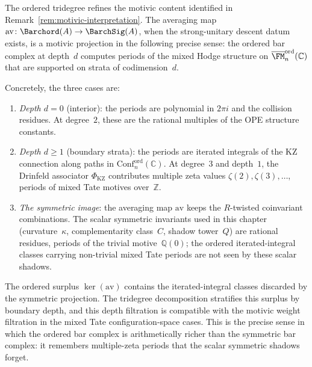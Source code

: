 \begin{remark}
\label{rem:tridegree-motivic}
The ordered tridegree refines the motivic content identified in
Remark~\ref{rem:motivic-interpretation}. The averaging map
$\mathrm{av}\colon\Barchord(A) \to \BarchSig(A)$, when the
strong-unitary descent datum exists, is a motivic projection in the
following precise sense: the ordered bar
complex at depth~$d$ computes periods of the mixed Hodge structure
on $\overline{\FM}_n^{\mathrm{ord}}(\mathbb{C})$ that are supported
on strata of codimension~$d$.

Concretely, the three cases are:
\begin{enumerate}[label=\textup{(\roman*)}]
\item \emph{Depth $d = 0$} (interior): the periods are polynomial in
$2\pi i$ and the collision residues. At degree~$2$, these are
the rational multiples of the OPE structure constants.

\item \emph{Depth $d \geq 1$} (boundary strata): the periods are
iterated integrals of the KZ connection along paths in
$\mathrm{Conf}_n^{\mathrm{ord}}(\mathbb{C})$. At degree~$3$ and
depth~$1$, the Drinfeld associator $\Phi_{\mathrm{KZ}}$
contributes multiple zeta values $\zeta(2), \zeta(3), \ldots$,
periods of mixed Tate motives over~$\mathbb{Z}$.

\item \emph{The symmetric image}: the averaging map $\mathrm{av}$
keeps the $R$-twisted coinvariant combinations. The scalar symmetric
invariants used in this chapter (curvature~$\kappa$,
complementarity class~$C$, shadow tower~$Q$) are rational residues,
periods of the trivial motive~$\mathbb{Q}(0)$; the ordered
iterated-integral classes carrying non-trivial mixed Tate periods
are not seen by these scalar shadows.
\end{enumerate}

\noindent
The ordered surplus $\ker(\mathrm{av})$ contains the iterated-integral
classes discarded by the symmetric projection. The tridegree
decomposition stratifies this surplus by boundary depth, and this
depth filtration is compatible with the motivic weight filtration in
the mixed Tate configuration-space cases. This is the precise sense in
which the ordered bar complex is arithmetically richer than the
symmetric bar complex: it remembers multiple-zeta periods that the
scalar symmetric shadows forget.
\end{remark}


